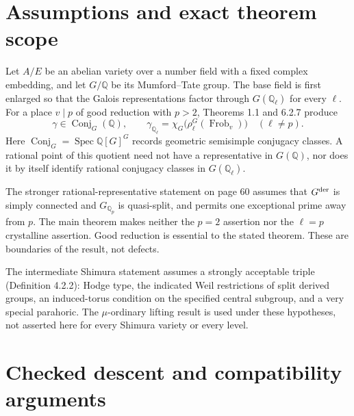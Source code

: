 \documentclass[10pt]{article}
\begin{document}
\section*{Assumptions and exact theorem scope}
Let \(A/E\) be an abelian variety over a number field with a fixed complex embedding, and let \(G/\mathbb Q\) be its Mumford–Tate group. The base field is first enlarged so that the Galois representations factor through \(G(\mathbb Q_\ell)\) for every \(\ell\). For a place \(v\mid p\) of good reduction with \(p>2\), Theorems 1.1 and 6.2.7 produce \[\gamma\in\operatorname{Conj}_G(\mathbb Q),\qquad
 \gamma_{\mathbb Q_\ell}
   =\chi_G\bigl(\rho_\ell^G(\operatorname{Frob}_v)\bigr)
       \quad(\ell\ne p).\] Here \(\operatorname{Conj}_G=\operatorname{Spec}\mathbb Q[G]^G\) records geometric semisimple conjugacy classes. A rational point of this quotient need not have a representative in \(G(\mathbb Q)\), nor does it by itself identify rational conjugacy classes in \(G(\mathbb Q_\ell)\).\par
The stronger rational-representative statement on page 60 assumes that \(G^{\rm der}\) is simply connected and \(G_{\mathbb Q_p}\) is quasi-split, and permits one exceptional prime away from \(p\). The main theorem makes neither the \(p=2\) assertion nor the \(\ell=p\) crystalline assertion. Good reduction is essential to the stated theorem. These are boundaries of the result, not defects.\par
The intermediate Shimura statement assumes a strongly acceptable triple (Definition 4.2.2): Hodge type, the indicated Weil restrictions of split derived groups, an induced-torus condition on the specified central subgroup, and a very special parahoric. The \(\mu\)-ordinary lifting result is used under these hypotheses, not asserted here for every Shimura variety or every level.\par
\section*{Checked descent and compatibility arguments}
\end{document}
